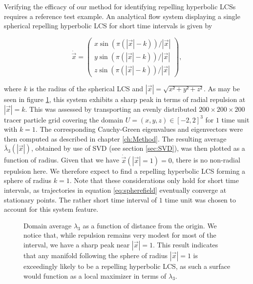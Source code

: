 Verifying the efficacy of our method for identifying repelling hyperbolic LCSs requires a reference test example. An analytical flow system displaying a single spherical repelling hyperbolic LCS for short time intervals is given by

\begin{equation}\label{eq:spherefield}
\dot{\vec{x}} = \begin{pmatrix}
x\sin(\pi(\left|\vec{x}\right|-k))/\left|\vec{x}\right|\\
y\sin(\pi(\left|\vec{x}\right|-k))/\left|\vec{x}\right|\\
z\sin(\pi(\left|\vec{x}\right|-k))/\left|\vec{x}\right|
\end{pmatrix},
\end{equation}

\noindent where $k$ is the radius of the spherical LCS and $\left|\vec{x}\right|=\sqrt{x²+y²+z²}$. As may be seen in figure \ref{fig:sperical_lm3}, this system exhibits a sharp peak in terms of radial repulsion at $\left|\vec{x}\right|=k$. This was assessed by transporting an evenly distributed $200\times200\times200$ tracer particle grid covering the domain $U = (x,y,z) \in [-2,2]^3$ for $1$ time unit with $k=1$.  The corresponding Cauchy-Green eigenvalues and eigenvectors were then computed as described in chapter \ref{ch:Method}. The resulting average $\bar{\lambda}_3(\left|\vec{x}\right|)$, obtained by use of SVD (see section \ref{sec:SVD}), was then plotted as a function of radius. Given that we have $\dot{\vec{x}}(\left|\vec{x}\right|=1)=0$, there is no non-radial repulsion here. We therefore expect to find a repelling hyperbolic LCS forming a sphere of radius $k=1$. Note that these considerations only hold for short time intervals, as trajectories in equation \eqref{eq:spherefield} eventually converge at stationary points. The rather short time interval of $1$ time unit was chosen to account for this system feature.

\begin{figure}[h!]
\centering
\resizebox{0.9\textwidth}{!}{}
\caption{Domain average $\lambda_3$ as a function of distance from the origin. We notice that, while repulsion remains very modest for most of the interval, we have a sharp peak near $\left|\vec{x}\right|=1$. This result indicates that any manifold following the sphere of radius $\left|\vec{x}\right|=1$ is exceedingly likely to be a repelling hyperbolic LCS, as such a surface would function as a local maximizer in terms of $\lambda_3$.}\label{fig:sperical_lm3}
\end{figure}

